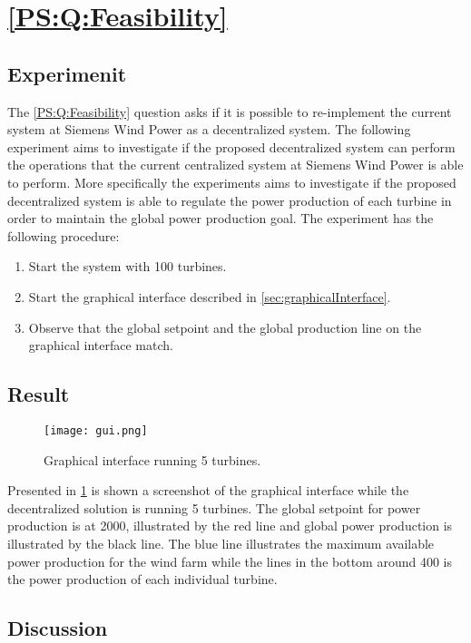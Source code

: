 
\section{\ref{PS:Q:Feasibility}}
\subsection{Experimenit}

The \ref{PS:Q:Feasibility} question asks if it is possible to re-implement the current system at Siemens Wind Power as a decentralized system. The following experiment aims to investigate if the proposed decentralized system can perform the operations that the current centralized system at Siemens Wind Power is able to perform. More specifically the experiments aims to investigate if the proposed decentralized system is able to regulate the power production of each turbine in order to maintain the global power production goal.
The experiment has the following procedure:
\begin{enumerate}
	\item Start the system with 100 turbines.
	\item Start the graphical interface described in \cref{sec:graphicalInterface}.
	\item Observe that the global setpoint and the global production line on the graphical interface match.
\end{enumerate}








\subsection{Result}
\label{sec:exp:feasibility}
\begin{figure} [!h]
	\centering
	\texttt{[image: gui.png]} 
	\caption[Graphical interface running 5 turbines]{
		\label{fig:graphicalInterface} 
		\footnotesize{%
			Graphical interface running 5 turbines.
		}
	}
\end{figure}
Presented in \cref{fig:graphicalInterface} is shown a screenshot of the graphical interface while the decentralized solution is running 5 turbines.
The global setpoint for power production is at 2000, illustrated by the red line and global power production is illustrated by the black line.
The blue line illustrates the maximum available power production for the wind farm while the lines in the bottom around 400 is the power production of each individual turbine.

\subsection{Discussion}
